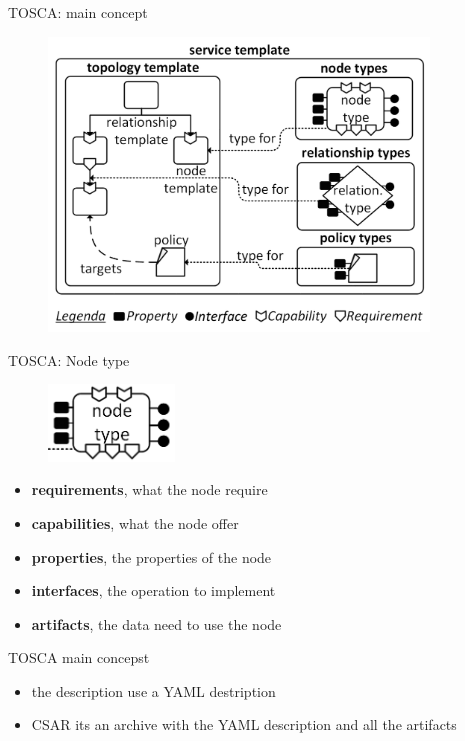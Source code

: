 \documentclass{beamer}
\begin{document}
  \begin{frame}{TOSCA: main concept}
    \begin{figure}
      \includegraphics[width=0.9\textwidth]{img/service-template.png}
    \end{figure}
  \end{frame}

  \begin{frame}{TOSCA: Node type}
    \begin{figure}
      \includegraphics[width=0.3\textwidth]{img/tosca_node_type.png}
    \end{figure}
    \begin{itemize}
      \item \textbf{requirements}, what the node require
      \item \textbf{capabilities}, what the node offer
      \item \textbf{properties}, the properties of the node
      \item \textbf{interfaces}, the operation to implement
      \item \textbf{artifacts}, the data need to use the node
    \end{itemize}
  \end{frame}

  \begin{frame}{TOSCA main concepst}
      \begin{itemize}
        \item the description use a YAML destription
        \item CSAR its an archive with the YAML description and all the artifacts
      \end{itemize}
  \end{frame}
\end{document}
